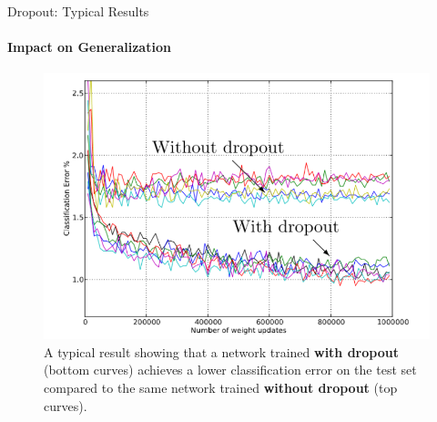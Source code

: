 \begin{frame}{Dropout: Typical Results}
    \framesubtitle{Impact on Generalization}
    \begin{figure}
        \centering
        \includegraphics[width=0.9\linewidth]{images/dropout_results.png}
        \caption{A typical result showing that a network trained \textbf{with dropout} (bottom curves) achieves a lower classification error on the test set compared to the same network trained \textbf{without dropout} (top curves).}
    \end{figure}
\end{frame}